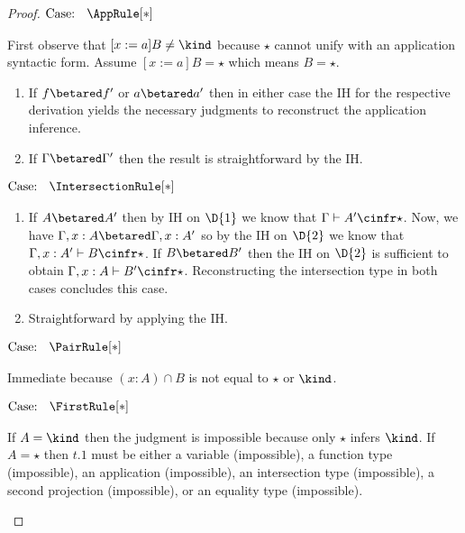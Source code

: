 \begin{proof}
$\text{Case: }\begin{array}{c} \AppRule[*] \end{array}$
\begin{proofcase}
    First observe that $[x := a]B \neq \kind$ because $\star$ cannot unify with an application syntactic form.
    Assume $[x := a]B = \star$ which means $B = \star$.
    \begin{enumerate}
        \item {
            If $f \betared f^\prime$ or $a \betared a^\prime$ then in either case the IH for the respective derivation yields the necessary judgments to reconstruct the application inference.
        }
        \item {
            If $\Gamma \betared \Gamma^\prime$ then the result is straightforward by the IH.
        }
    \end{enumerate}
\end{proofcase}

$\text{Case: }\begin{array}{c} \IntersectionRule[*] \end{array}$
\begin{proofcase}
    \begin{enumerate}
        \item {
            If $A \betared A^\prime$ then by IH on $\D{1}$ we know that $\Gamma \vdash A^\prime \cinfr \star$.
            Now, we have $\Gamma,x:A \betared \Gamma,x:A^\prime$ so by the IH on $\D{2}$ we know that $\Gamma,x:A^\prime \vdash B \cinfr \star$.
            If $B \betared B^\prime$ then the IH on $\D{2}$ is sufficient to obtain $\Gamma,x:A \vdash B^\prime \cinfr \star$.
            Reconstructing the intersection type in both cases concludes this case.
        }
        \item {
            Straightforward by applying the IH.
        }
    \end{enumerate}
\end{proofcase}

$\text{Case: }\begin{array}{c} \PairRule[*] \end{array}$
\begin{proofcase}
    Immediate because $(x : A) \cap B$ is not equal to $\star$ or $\kind$.
\end{proofcase}

$\text{Case: }\begin{array}{c} \FirstRule[*] \end{array}$
\begin{proofcase}
    If $A = \kind$ then the judgment is impossible because only $\star$ infers $\kind$.
    If $A = \star$ then $t.1$ must be either a variable (impossible), a function type (impossible), an application (impossible), an intersection type (impossible), a second projection (impossible), or an equality type (impossible).


\end{proofcase}
\end{proof}
